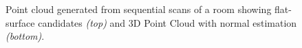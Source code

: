 			\begin{figure}[!h]
				\centering
				\caption{Point cloud generated from sequential scans of a room showing flat-surface candidates \emph{(top)} and 3D Point Cloud with normal estimation \emph{(bottom)}.}
				\label{fig::surface_estimation}
			\end{figure}
